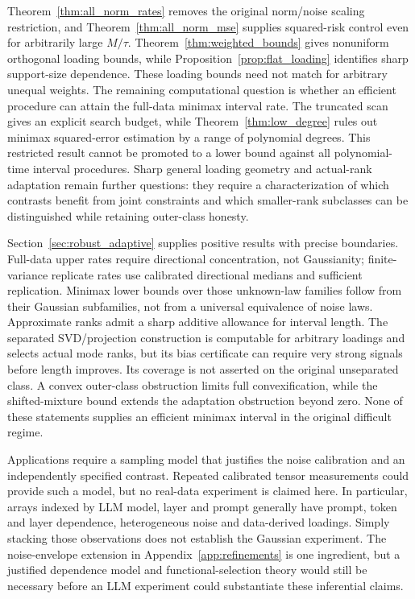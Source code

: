 \documentclass[11pt]{article}
\theoremstyle{remark}
\begin{document}
Theorem~\ref{thm:all_norm_rates} removes the original norm/noise scaling restriction, and Theorem~\ref{thm:all_norm_mse} supplies squared-risk control even for arbitrarily large $M/\tau$. Theorem~\ref{thm:weighted_bounds} gives nonuniform orthogonal loading bounds, while Proposition~\ref{prop:flat_loading} identifies sharp support-size dependence. These loading bounds need not match for arbitrary unequal weights. The remaining computational question is whether an efficient procedure can attain the full-data minimax interval rate. The truncated scan gives an explicit search budget, while Theorem~\ref{thm:low_degree} rules out minimax squared-error estimation by a range of polynomial degrees. This restricted result cannot be promoted to a lower bound against all polynomial-time interval procedures. Sharp general loading geometry and actual-rank adaptation remain further questions: they require a characterization of which contrasts benefit from joint constraints and which smaller-rank subclasses can be distinguished while retaining outer-class honesty.

Section~\ref{sec:robust_adaptive} supplies positive results with precise boundaries. Full-data upper rates require directional concentration, not Gaussianity; finite-variance replicate rates use calibrated directional medians and sufficient replication. Minimax lower bounds over those unknown-law families follow from their Gaussian subfamilies, not from a universal equivalence of noise laws. Approximate ranks admit a sharp additive allowance for interval length. The separated SVD/projection construction is computable for arbitrary loadings and selects actual mode ranks, but its bias certificate can require very strong signals before length improves. Its coverage is not asserted on the original unseparated class. A convex outer-class obstruction limits full convexification, while the shifted-mixture bound extends the adaptation obstruction beyond zero. None of these statements supplies an efficient minimax interval in the original difficult regime.

Applications require a sampling model that justifies the noise calibration and an independently specified contrast. Repeated calibrated tensor measurements could provide such a model, but no real-data experiment is claimed here. In particular, arrays indexed by LLM model, layer and prompt generally have prompt, token and layer dependence, heterogeneous noise and data-derived loadings. Simply stacking those observations does not establish the Gaussian experiment. The noise-envelope extension in Appendix~\ref{app:refinements} is one ingredient, but a justified dependence model and functional-selection theory would still be necessary before an LLM experiment could substantiate these inferential claims.
\end{document}
